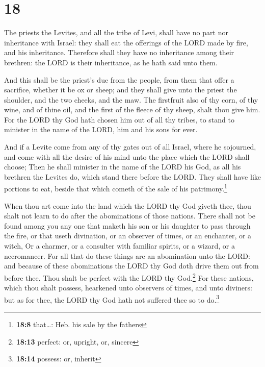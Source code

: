 \hypertarget{section-17}{%
\section{18}\label{section-17}}

 The priests the Levites, and all the tribe of Levi, shall
have no part nor inheritance with Israel: they shall eat the offerings
of the LORD made by fire, and his inheritance.  Therefore
shall they have no inheritance among their brethren: the LORD is their
inheritance, as he hath said unto them.

 And this shall be the priest's due from the people, from
them that offer a sacrifice, whether it be ox or sheep; and they shall
give unto the priest the shoulder, and the two cheeks, and the maw.
 The firstfruit also of thy corn, of thy wine, and of
thine oil, and the first of the fleece of thy sheep, shalt thou give
him.  For the LORD thy God hath chosen him out of all thy
tribes, to stand to minister in the name of the LORD, him and his sons
for ever.

 And if a Levite come from any of thy gates out of all
Israel, where he sojourned, and come with all the desire of his mind
unto the place which the LORD shall choose;  Then he shall
minister in the name of the LORD his God, as all his brethren the
Levites do, which stand there before the LORD.  They shall
have like portions to eat, beside that which cometh of the sale of his
patrimony.\footnote{\textbf{18:8} that\ldots: Heb. his sale by the
  fathers}

 When thou art come into the land which the LORD thy God
giveth thee, thou shalt not learn to do after the abominations of those
nations.  There shall not be found among you any one that
maketh his son or his daughter to pass through the fire, or that useth
divination, or an observer of times, or an enchanter, or a witch,
 Or a charmer, or a consulter with familiar spirits, or a
wizard, or a necromancer.  For all that do these things
are an abomination unto the LORD: and because of these abominations the
LORD thy God doth drive them out from before thee.  Thou
shalt be perfect with the LORD thy God.\footnote{\textbf{18:13} perfect:
  or, upright, or, sincere}  For these nations, which
thou shalt possess, hearkened unto observers of times, and unto
diviners: but as for thee, the LORD thy God hath not suffered thee so to
do.\footnote{\textbf{18:14} possess: or, inherit}

